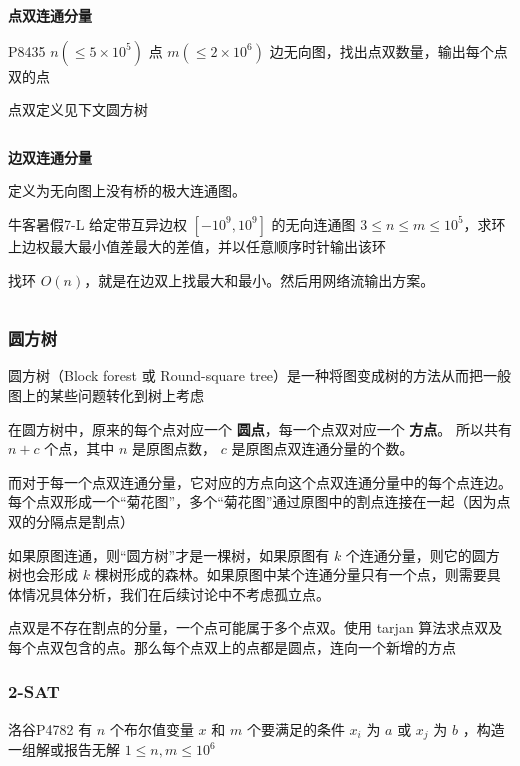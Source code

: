 \documentclass[twocolumn,10pt]{ctexart}
\makeatletter
\newcommand{\hfive}[1]{\par\addvspace{6pt}\@afterindentfalse
  {\noindent\bfseries\normalsize #1}\par\nobreak\vspace{2pt}}
\makeatother
\begin{document}
\inputminted{cpp}{code/uva796_bridge.cpp}

\hfive{点双连通分量}

\begin{notebox}
P8435 $n(\le5\times10^5)$ 点 $m(\le2\times10^6)$ 边无向图，找出点双数量，输出每个点双的点
\end{notebox}

点双定义见下文圆方树

\inputminted{cpp}{code/p8435_ppint_biconnect.cpp}

\hfive{边双连通分量}

定义为无向图上没有桥的极大连通图。

\begin{notebox}
牛客暑假7-L 给定带互异边权 $[-10^9,10^9]$ 的无向连通图 $3\le n\le m\le10^5$，求环上边权最大最小值差最大的差值，并以任意顺序时针输出该环
\end{notebox}

找环 $O(n)$，就是在边双上找最大和最小。然后用网络流输出方案。

\inputminted{cpp}{code/ext_046.cpp}

\subsubsection{圆方树}

圆方树（Block forest 或 Round-square tree）是一种将图变成树的方法从而把一般图上的某些问题转化到树上考虑

在圆方树中，原来的每个点对应一个 \textbf{圆点}，每一个点双对应一个 \textbf{方点}。 所以共有 $n+c$ 个点，其中 $n$ 是原图点数， $c$ 是原图点双连通分量的个数。

而对于每一个点双连通分量，它对应的方点向这个点双连通分量中的每个点连边。 每个点双形成一个“菊花图”，多个“菊花图”通过原图中的割点连接在一起（因为点双的分隔点是割点）

如果原图连通，则“圆方树”才是一棵树，如果原图有 $k$ 个连通分量，则它的圆方树也会形成 $k$ 棵树形成的森林。如果原图中某个连通分量只有一个点，则需要具体情况具体分析，我们在后续讨论中不考虑孤立点。

点双是不存在割点的分量，一个点可能属于多个点双。使用 tarjan 算法求点双及每个点双包含的点。那么每个点双上的点都是圆点，连向一个新增的方点

\subsubsection{2-SAT}

\begin{notebox}
洛谷P4782 有 $n$ 个布尔值变量 $x$ 和 $m$ 个要满足的条件 $x_i$ 为 $a$ 或 $x_j$ 为 $b$ ，构造一组解或报告无解 $1\le n,m\le10^6$
\end{notebox}
\end{document}
